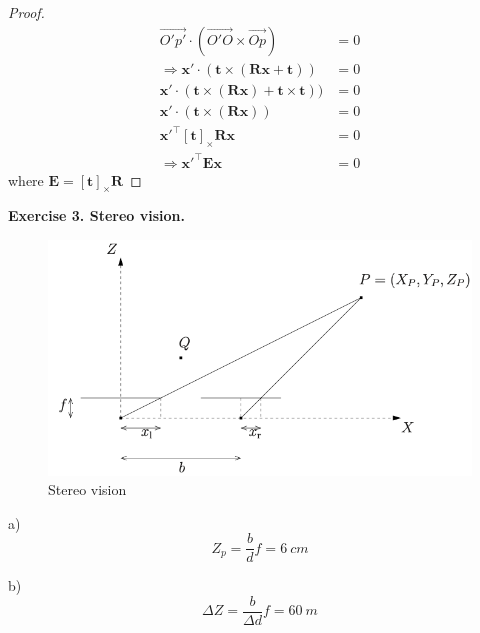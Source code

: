 \documentclass[letterpaper, 11pt]{article}
\begin{document}
\begin{proof}
    \begin{align}
        \overrightarrow{O'p'}\cdot(\overrightarrow{O'O}\times\overrightarrow{Op})            & =0          \\
        \Rightarrow \textbf{x}'\cdot(\textbf{t}\times(\textbf{R}\textbf{x}+\textbf{t}))      & =0\nonumber \\
        \textbf{x}'\cdot(\textbf{t}\times(\textbf{R}\textbf{x})+\textbf{t}\times\textbf{t})) & =0\nonumber \\
        \textbf{x}'\cdot(\textbf{t}\times(\textbf{R}\textbf{x}))                             & =0\nonumber \\
        \textbf{x}'^\top[\textbf{t}]_\times\textbf{R}\textbf{x}                              & =0\nonumber \\
        \Rightarrow\textbf{x}'^\top\textbf{E}\textbf{x}                                      & =0\nonumber
    \end{align}
    where $\textbf{E} = [\textbf{t}]_\times\textbf{R}$
\end{proof}
\newpage
\textbf{Exercise 3. Stereo vision.}
\begin{figure}[H]
    \centering
    \includegraphics[width=0.6\columnwidth]{Stereo.png}
    \caption{Stereo vision}
    \label{fig:ste_vis}
\end{figure}
a)
$$
    Z_p = \frac{b}{d}f = 6\ cm
$$

b)
$$
    \Delta Z = \frac{b}{\Delta d} f = 60\ m
$$
\end{document}
